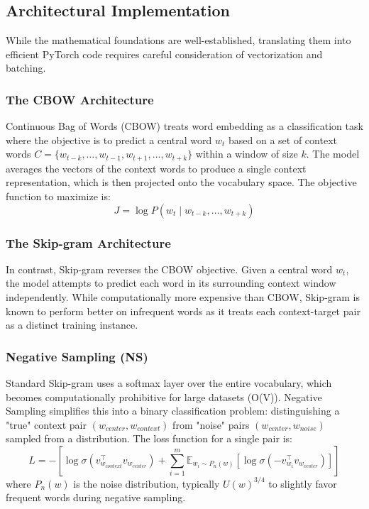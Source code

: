 \documentclass[12pt,a4paper]{article}
\begin{document}
\subsection{Architectural Implementation}
While the mathematical foundations are well-established, translating them into efficient PyTorch code requires careful consideration of vectorization and batching.

\subsubsection{The CBOW Architecture}
Continuous Bag of Words (CBOW) treats word embedding as a classification task where the objective is to predict a central word $w_t$ based on a set of context words $C = \{w_{t-k}, \ldots, w_{t-1}, w_{t+1}, \ldots, w_{t+k}\}$ within a window of size $k$. The model averages the vectors of the context words to produce a single context representation, which is then projected onto the vocabulary space.
The objective function to maximize is:
\begin{equation}
    J = \log P(w_t \mid w_{t-k}, \dots, w_{t+k})
\end{equation}

\subsubsection{The Skip-gram Architecture}
In contrast, Skip-gram reverses the CBOW objective. Given a central word $w_t$, the model attempts to predict each word in its surrounding context window independently. While computationally more expensive than CBOW, Skip-gram is known to perform better on infrequent words as it treats each context-target pair as a distinct training instance.

\subsubsection{Negative Sampling (NS)}
Standard Skip-gram uses a softmax layer over the entire vocabulary, which becomes computationally prohibitive for large datasets (O(V)). Negative Sampling simplifies this into a binary classification problem: distinguishing a "true" context pair $(w_{center}, w_{context})$ from "noise" pairs $(w_{center}, w_{noise})$ sampled from a distribution. The loss function for a single pair is:
\begin{equation}
    L = - \left[ \log \sigma(v_{w_{context}}^\top v_{w_{center}}) + \sum_{i=1}^{m} \mathbb{E}_{w_i \sim P_n(w)} [\log \sigma(-v_{w_i}^\top v_{w_{center}})] \right]
\end{equation}
where $P_n(w)$ is the noise distribution, typically $U(w)^{3/4}$ to slightly favor frequent words during negative sampling.
\end{document}
